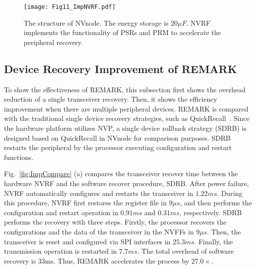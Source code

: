 \begin{figure}[htpb]
    \centering
    \vspace{-0pt}
    \texttt{[image: Fig11\_ImpNVRF.pdf]}
    \vspace{-2pt}
    \caption{The structure of NVnode. The energy storage is $20\mu F$. NVRF implements the functionality of PSRs and PRM to accelerate the peripheral recovery.}
    \vspace{-5pt}
    \label{fig:ImpNVRF}
\end{figure}



\subsection{Device Recovery Improvement of REMARK} \label{sec:implPeriRecover}
\vspace{-5pt}
%
To show the effectiveness of REMARK, this subsection first shows the overhead reduction of a single transceiver recovery. 
Then, it shows the efficiency improvement when there are multiple peripheral devices. 
REMARK is compared with the traditional single device recovery strategies, such as QuickRecall~\cite{jayakumar2014quickrecall}. 
Since the hardware platform utilizes NVP, a single device rollback strategy (SDRB) is designed based on QuickRecall in NVnode for comparison purposes.
SDRB restarts the peripheral by the processor executing configuration and restart functions.

Fig.~\ref{fig:ImpCompare} (a) compares the transceiver recover time between the hardware NVRF and the software recover procedure, SDRB.
After power failure, NVRF automatically configures and restarts the transceiver in $1.22ms$.
During this procedure, NVRF first restores the register file in $9 \mu s$, and then performs the configuration and restart operation in $0.91ms$ and $0.31ms$, respectively. 
SDRB performs the recovery with three steps.
Firstly, the processor recovers the configurations and the data of the transceiver in the NVFFs in $9\mu s$.
Then, the transceiver is reset and configured via SPI interfaces in $25.3ms$.
Finally, the transmission operation is restarted in $7.7ms$.
The total overhead of software recovery is 33ms.
Thus, REMARK accelerates the process by $27.0\times$. 

